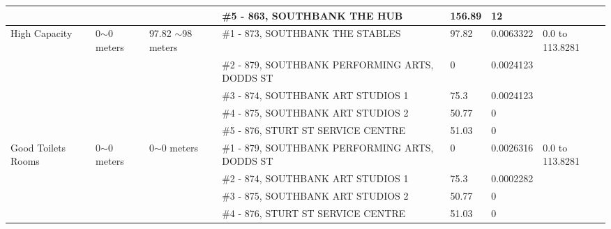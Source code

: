 \begin{table}[H]
{\begin{tabular}{|l|l|l|l|l|l|l|}
                   &                            &                                                 & \#5 - 863, SOUTHBANK THE HUB                          & 156.89        & 12              &                           \\ \hline
High Capacity      & 0$\sim$0 meters            & 97.82 $\sim$98 meters                           & \#1 - 873, SOUTHBANK THE STABLES                      & 97.82         & 0.0063322       & 0.0 to 113.8281           \\ \hline
                   &                            &                                                 & \#2 - 879, SOUTHBANK PERFORMING ARTS, DODDS ST        & 0             & 0.0024123       &                           \\ \hline
                   &                            &                                                 & \#3 - 874, SOUTHBANK ART STUDIOS 1                    & 75.3          & 0.0024123       &                           \\ \hline
                   &                            &                                                 & \#4 - 875, SOUTHBANK ART STUDIOS 2                    & 50.77         & 0               &                           \\ \hline
                   &                            &                                                 & \#5 - 876, STURT ST SERVICE CENTRE                    & 51.03         & 0               &                           \\ \hline
Good Toilets Rooms & 0$\sim$0 meters            & 0$\sim$0 meters                                 & \#1 - 879, SOUTHBANK PERFORMING ARTS, DODDS ST        & 0             & 0.0026316       & 0.0 to 113.8281           \\ \hline
                   &                            &                                                 & \#2 - 874, SOUTHBANK ART STUDIOS 1                    & 75.3          & 0.0002282       &                           \\ \hline
                   &                            &                                                 & \#3 - 875, SOUTHBANK ART STUDIOS 2                    & 50.77         & 0               &                           \\ \hline
                   &                            &                                                 & \#4 - 876, STURT ST SERVICE CENTRE                    & 51.03         & 0               &                           \\ \hline

\end{tabular}}
\end{table}
